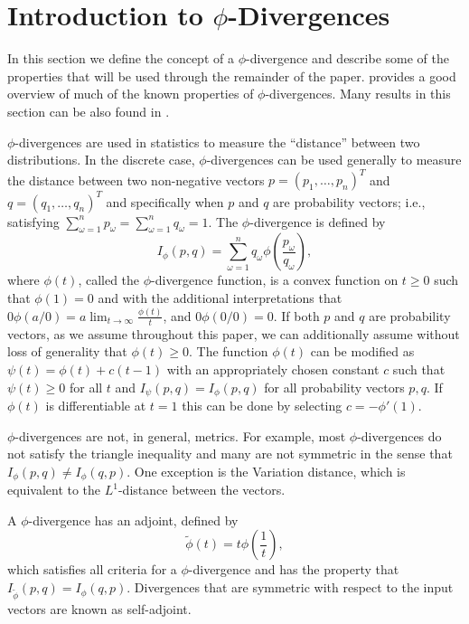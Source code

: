 \documentclass[12pt]{article}
\theoremstyle{plain}
\theoremstyle{definition}
\theoremstyle{remark}
\begin{document}
\section{Introduction to $\phi$-Divergences}
\label{sec:phi_divergences}

In this section we define the concept of a $\phi$-divergence and describe some of the properties that will be used through the remainder of the paper.
\citet{pardo2005statistical} provides a good overview of much of the known properties of $\phi$-divergences.
Many results in this section can be also found in \citep{bental2011robust}.

$\phi$-divergences are used in statistics to measure the ``distance'' between two distributions. 
In the discrete case, $\phi$-divergences can be used generally to measure the distance between two non-negative vectors $p = (p_1, \dots, p_n)^T$ and $q = (q_1, \dots, q_n)^T$ and specifically when $p$ and $q$ are probability vectors; i.e., satisfying $\sum_{\omega=1}^n p_\omega = \sum_{\omega=1}^n q_\omega = 1$.
The $\phi$-divergence is defined by
\[
	I_\phi(p,q) = \sum_{\omega=1}^n q_\omega \phi\left(\frac{p_\omega}{q_\omega}\right),
\]
where $\phi(t)$, called the $\phi$-divergence function, is a convex function on $t \geq 0$ such that $\phi(1) = 0$ and with the additional interpretations that $0 \phi(a/0) = a \lim_{t \rightarrow \infty} \frac{\phi(t)}{t}$, and $0 \phi(0/0) = 0$.
If both $p$ and $q$ are probability vectors, as we assume throughout this paper, we can additionally assume without loss of generality that $\phi(t) \geq 0$.
The function $\phi(t)$ can be modified as $\psi(t) = \phi(t) + c(t-1)$ with an appropriately chosen constant $c$ such that $\psi(t) \geq 0$ for all $t$ and $I_\psi(p,q) = I_\phi(p,q)$ for all probability vectors $p,q$.
If $\phi(t)$ is differentiable at $t = 1$ this can be done by selecting $c = -\phi'(1)$.

$\phi$-divergences are not, in general, metrics.
For example, most $\phi$-divergences do not satisfy the triangle inequality and many are not symmetric in the sense that $I_\phi(p,q) \neq I_\phi(q,p)$.
One exception is the Variation distance, which is equivalent to the $L^1$-distance between the vectors.

A $\phi$-divergence has an adjoint, defined by
\begin{equation} \label{eq:adjoint}
	\tilde{\phi}(t) = t \phi\left(\frac{1}{t}\right),
\end{equation}
which satisfies all criteria for a $\phi$-divergence \citep{bental1991certainty} and has the property that $I_{\tilde{\phi}}(p,q) = I_\phi(q,p)$.
Divergences that are symmetric with respect to the input vectors are known as self-adjoint.
\end{document}
